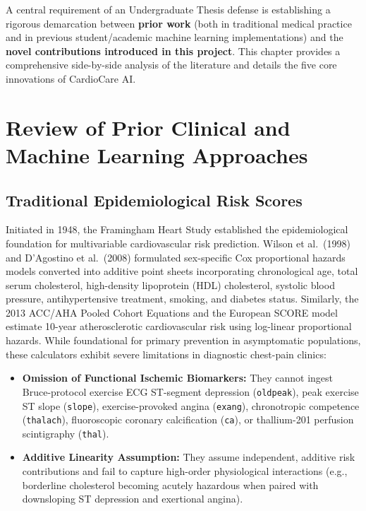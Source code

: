 \documentclass[12pt,a4paper]{report}
\begin{document}
A central requirement of an Undergraduate Thesis defense is establishing a rigorous demarcation between \textbf{prior work} (both in traditional medical practice and in previous student/academic machine learning implementations) and the \textbf{novel contributions introduced in this project}. This chapter provides a comprehensive side-by-side analysis of the literature and details the five core innovations of CardioCare AI.

\section{Review of Prior Clinical and Machine Learning Approaches}

\subsection{Traditional Epidemiological Risk Scores}
Initiated in 1948, the Framingham Heart Study established the epidemiological foundation for multivariable cardiovascular risk prediction. Wilson et al.\ (1998) \cite{wilson1998prediction} and D'Agostino et al.\ (2008) \cite{dagostino2008general} formulated sex-specific Cox proportional hazards models converted into additive point sheets incorporating chronological age, total serum cholesterol, high-density lipoprotein (HDL) cholesterol, systolic blood pressure, antihypertensive treatment, smoking, and diabetes status. Similarly, the 2013 ACC/AHA Pooled Cohort Equations \cite{goff2014acc} and the European SCORE model estimate 10-year atherosclerotic cardiovascular risk using log-linear proportional hazards. While foundational for primary prevention in asymptomatic populations, these calculators exhibit severe limitations in diagnostic chest-pain clinics:
\begin{itemize}
    \item \textbf{Omission of Functional Ischemic Biomarkers:} They cannot ingest Bruce-protocol exercise ECG ST-segment depression (\texttt{oldpeak}), peak exercise ST slope (\texttt{slope}), exercise-provoked angina (\texttt{exang}), chronotropic competence (\texttt{thalach}), fluoroscopic coronary calcification (\texttt{ca}), or thallium-201 perfusion scintigraphy (\texttt{thal}).
    \item \textbf{Additive Linearity Assumption:} They assume independent, additive risk contributions and fail to capture high-order physiological interactions (e.g., borderline cholesterol becoming acutely hazardous when paired with downsloping ST depression and exertional angina).
\end{itemize}
\end{document}
